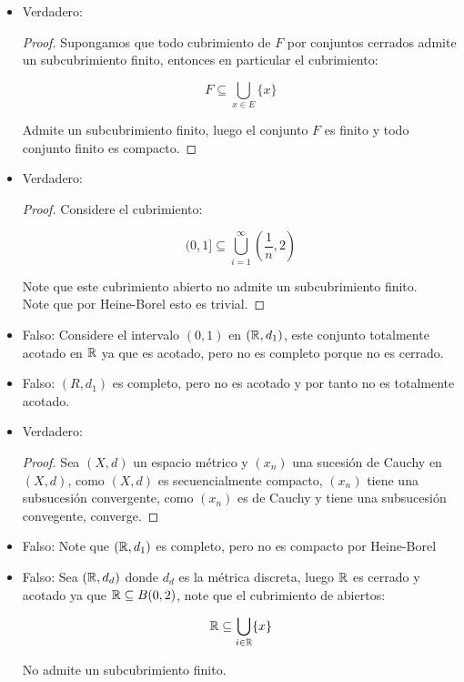 \begin{itemize}[label={✎},leftmargin=*]
    \item Verdadero:\\

    \begin{proof}
    Supongamos que todo cubrimiento de $F$ por conjuntos cerrados admite un subcubrimiento finito, entonces en particular el cubrimiento:

    $$F\subseteq\bigcup_{x \in E}\{x\} 
        $$

     Admite un subcubrimiento finito, luego el conjunto $F$ es finito y todo conjunto finito es compacto.
    \end{proof}

    \item Verdadero:\\

    \begin{proof}
    Considere el cubrimiento:

    $$(0,1]\subseteq\bigcup_{i=1}^{\infty} 
        \left(\frac{1}{n},2\right)$$

    Note que este cubrimiento abierto no admite un subcubrimiento finito.\\

    Note que por Heine-Borel esto es trivial.
    \end{proof}

    \item Falso: Considere el intervalo $(0,1)$ en $(\mathbb{R},d_1)$, este conjunto totalmente acotado en $\mathbb{R}$ ya que es acotado, pero no es completo porque no es cerrado.

    \item Falso: $(R,d_1)$ es completo, pero no es acotado y por tanto no es totalmente acotado.

    \item Verdadero:\\

    \begin{proof}
    Sea $(X,d)$ un espacio métrico y $(x_n)$ una sucesión de Cauchy en $(X,d)$, como $(X,d)$ es secuencialmente compacto, $(x_n)$ tiene una subsucesión convergente, como $(x_n)$ es de Cauchy y tiene una subsucesión convegente, converge.
    \end{proof}

    \item Falso: Note que $(\mathbb{R},d_1)$ es completo, pero no es compacto por Heine-Borel

    \item Falso: Sea $(\mathbb{R},d_d)$ donde $d_d$ es la métrica discreta, luego $\mathbb{R}$ es cerrado y acotado ya que $\mathbb{R}\subseteq B(0,2)$, note que el cubrimiento de abiertos:

    $$\mathbb{R}\subseteq \bigcup_{i \in \mathbb{R}}\{x\}$$

        No admite un subcubrimiento finito.
\end{itemize}
 
